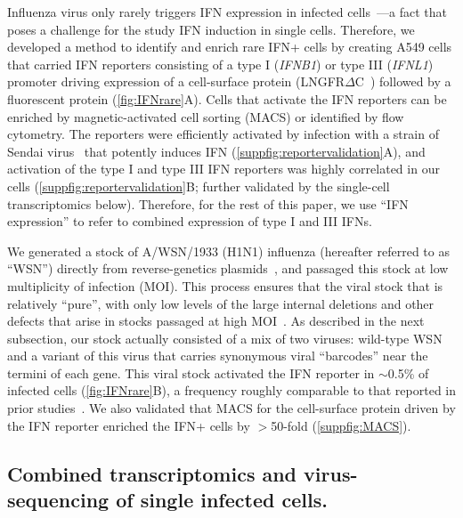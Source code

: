 \documentclass[]{asm-article}
\newcommand{\FIG}[1]{\autoref{fig:#1}}
\newcommand{\SUPPFIG}[1]{\autoref{suppfig:#1}}
\begin{document}
Influenza virus only rarely triggers IFN expression in infected cells~\cite{killip2017single, russell2018extreme, kallfass2013visualizing}---a fact that poses a challenge for the study IFN induction in single cells.
Therefore, we developed a method to identify and enrich rare IFN+ cells by creating A549 cells that carried IFN reporters consisting of a type I (\textit{IFNB1}) or type III (\textit{IFNL1}) promoter driving expression of a cell-surface protein (LNGFR$\Delta$C~\cite{bonini1997hsv,ruggieri1997cell}) followed by a fluorescent protein (\FIG{IFNrare}A).
Cells that activate the IFN reporters can be enriched by magnetic-activated cell sorting (MACS) or identified by flow cytometry.
The reporters were efficiently activated by infection with a strain of Sendai virus~\cite{strahle2006sendai} that potently induces IFN (\SUPPFIG{reportervalidation}A), and activation of the type I and type III IFN reporters was highly correlated in our cells (\SUPPFIG{reportervalidation}B; further validated by the single-cell transcriptomics below).
Therefore, for the rest of this paper, we use ``IFN expression'' to refer to combined expression of type I and III IFNs. 

We generated a stock of A/WSN/1933 (H1N1) influenza (hereafter referred to as ``WSN'') directly from reverse-genetics plasmids~\cite{hoffmann2000dna}, and passaged this stock at low multiplicity of infection (MOI).
This process ensures that the viral stock that is relatively ``pure'', with only low levels of the large internal deletions and other defects that arise in stocks passaged at high MOI~\cite{xue2016propagation}.
As described in the next subsection, our stock actually consisted of a mix of two viruses: wild-type WSN and a variant of this virus that carries synonymous viral ``barcodes'' near the termini of each gene.
This viral stock activated the IFN reporter in $\sim$0.5\% of infected cells  (\FIG{IFNrare}B), a frequency roughly comparable to that reported in prior studies~\cite{killip2017single, russell2018extreme}.
We also validated that MACS for the cell-surface protein driven by the IFN reporter enriched the IFN+ cells by $>$50-fold (\SUPPFIG{MACS}).

\subsection{Combined transcriptomics and virus-sequencing of single infected cells.}
\end{document}
